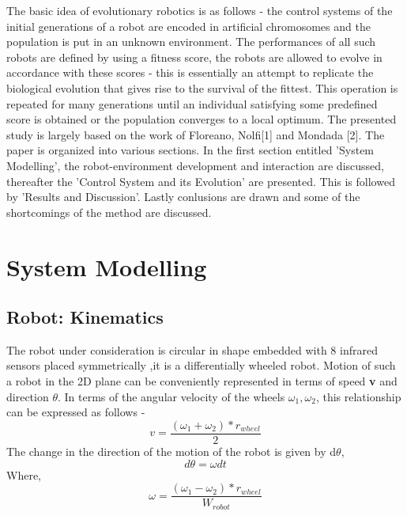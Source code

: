 \documentclass[12pt]{elsarticle}
\begin{document}
The basic idea of evolutionary robotics is as follows - the control systems of the initial generations of a robot are encoded in artificial chromosomes and the population is put in an unknown environment. The performances of all such robots are defined by using a fitness score, the robots are allowed to evolve in accordance with these scores - this is essentially an attempt to replicate the biological evolution that gives rise to the survival of the fittest. This operation is repeated for many generations until an individual satisfying some predefined score is obtained or the population converges to a local optimum. The presented study is largely based on the work of Floreano, Nolfi[1] and Mondada [2]. The paper is organized into various sections. In the first section entitled 'System Modelling', the robot-environment development and interaction are discussed, thereafter the 'Control System and its Evolution' are presented. This is followed by 'Results and Discussion'.
Lastly conlusions are drawn and some of the shortcomings of the method are discussed. 



\section{System Modelling}

\subsection{Robot: Kinematics}

The robot under consideration is circular in shape embedded with 8 infrared sensors placed symmetrically ,it is a differentially wheeled robot. 
Motion of such a robot in the 2D plane can be conveniently represented in terms of speed \textbf{v} and direction $\theta$. In terms of the angular velocity of the wheels $\omega_1, \omega_2$, this relationship can be expressed as follows - 
\begin{equation}
v = \frac{(\omega_1 + \omega_2)*r_{wheel}}{2}
\end{equation}
The change in the direction of the motion of the robot is given by d$\theta$, 
\begin{equation}
d\theta = \omega dt
\end{equation}
Where,
\begin{equation}
\omega = \frac{(\omega_1 - \omega_2)*r_{wheel}}{ W_{robot}}
\end{equation}
\end{document}
